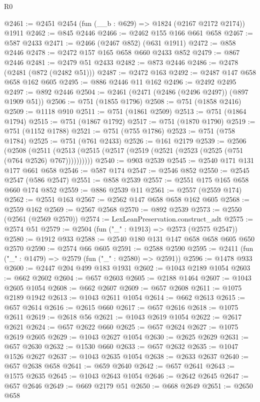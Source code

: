 \begin{lexlean}{R0}
\begin{coremodule}
@2461 := @2451 @2454 (fun (__b : @629) => @1824 (@2167 @2172 @2174)) @1911
@2462 := @845 @2446
@2466 := @2462 @155 @166 @661 @658
@2467 := @587 @2433
@2471 := @2466 (@2467 @852) (@631 @1911)
@2472 := @858 @2446
@2478 := @2472 @157 @165 @658 @660 @2433 @852
@2479 := @867 @2446
@2481 := @2479 @51 @2433
@2482 := @873 @2446
@2486 := @2478 (@2481 (@872 (@2482 @51)))
@2487 := @2472 @163
@2492 := @2487 @147 @658 @658 @162 @605
@2495 := @886 @2446 @11 @162
@2496 := @2492 @2495
@2497 := @892 @2446
@2504 := @2461 (@2471 (@2486 (@2496 @2497)) (@897 @1909 @51))
@2506 := @751 (@1855 @1796)
@2508 := @751 (@1858 @2416)
@2509 := @1118 @910
@2511 := @751 (@1861 @2509)
@2513 := @751 (@1864 @1794)
@2515 := @751 (@1867 @1792)
@2517 := @751 (@1870 @1790)
@2519 := @751 (@1152 @1788)
@2521 := @751 (@755 @1786)
@2523 := @751 (@758 @1784)
@2525 := @751 (@761 @2433)
@2526 := @161 @2179
@2539 := @2506
    (@2508 (@2511 (@2513 (@2515 (@2517 (@2519 (@2521 (@2523 (@2525 (@751 (@764 @2526) @767))))))))))
@2540 := @903 @2539
@2545 := @2540 @171 @131 @177 @661 @658
@2546 := @587 @174
@2547 := @2546 @852
@2550 := @2545 @2547 (@586 @2547)
@2551 := @858 @2539
@2557 := @2551 @175 @165 @658 @660 @174 @852
@2559 := @886 @2539 @11
@2561 := @2557 (@2559 @174)
@2562 := @2551 @163
@2567 := @2562 @147 @658 @658 @162 @605
@2568 := @2559 @162
@2569 := @2567 @2568
@2570 := @892 @2539
@2573 := @2550 (@2561 (@2569 @2570))
@2574 := LexLeanPreservation.construct_adt
@2575 := @2574 @51
@2579 := @2504 (fun ("_" : @1913) => @2573 (@2575 @2547))
@2580 := @1912 @933
@2588 := @2540 @180 @131 @147 @658 @658 @605 @650 @2570
@2590 := @2574 @66 @605
@2591 := @2588 @2590
@2595 := @2411 (fun ("_" : @1479) => @2579 (fun ("_" : @2580) => @2591))
@2596 := @1478 @933
@2600 := @2447 @204 @499 @183 @1931
@2602 := @1043 @2189 @1054
@2603 := @662 @2602
@2604 := @657 @2603
@2605 := @2188 @1464
@2607 := @1043 @2605 @1054
@2608 := @662 @2607
@2609 := @657 @2608
@2611 := @1075 @2189 @1942
@2613 := @1043 @2611 @1054
@2614 := @662 @2613
@2615 := @657 @2614
@2616 := @2615 @660
@2617 := @657 @2616
@2618 := @1075 @2611
@2619 := @2618 @56
@2621 := @1043 @2619 @1054
@2622 := @2617 @2621
@2624 := @657 @2622 @660
@2625 := @657 @2624
@2627 := @1075 @2619 @2605
@2629 := @1043 @2627 @1054
@2630 := @2625 @2629
@2631 := @657 @2630
@2632 := @1530 @660
@2633 := @657 @2632
@2635 := @1047 @1526 @2627
@2637 := @1043 @2635 @1054
@2638 := @2633 @2637
@2640 := @657 @2638 @658
@2641 := @659 @2640
@2642 := @657 @2641
@2643 := @1575 @2635
@2645 := @1043 @2643 @1054
@2646 := @2642 @2645
@2647 := @657 @2646
@2649 := @669 @2179 @51
@2650 := @668 @2649
@2651 := @2650 @658

\end{coremodule}
\end{lexlean}
